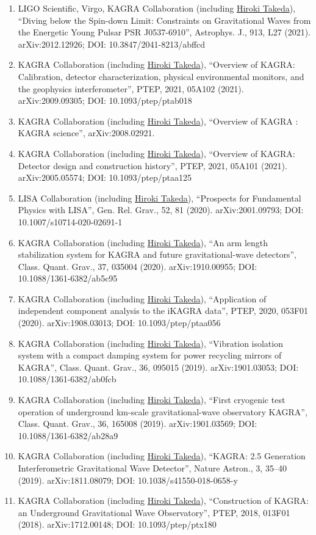 \documentclass[uplatex, 12pt]{article}
\begin{document}
\begin{enumerate}
\item LIGO Scientific, Virgo, KAGRA Collaboration (including \uline{Hiroki Takeda}), “Diving below the Spin-down Limit: Constraints on Gravitational Waves from the
Energetic Young Pulsar PSR J0537-6910”, Astrophys. J., 913, L27 (2021). arXiv:2012.12926; DOI: 10.3847/2041-8213/abffcd
\item KAGRA Collaboration (including \uline{Hiroki Takeda}), “Overview of KAGRA: Calibration, detector characterization, physical environmental monitors, and the geophysics interferometer”, PTEP, 2021, 05A102 (2021). arXiv:2009.09305; DOI: 10.1093/ptep/ptab018
\item KAGRA Collaboration (including \uline{Hiroki Takeda}), “Overview of KAGRA : KAGRA science”, arXiv:2008.02921.
\item KAGRA Collaboration (including \uline{Hiroki Takeda}), “Overview of KAGRA: Detector design and construction history”, PTEP, 2021, 05A101 (2021). arXiv:2005.05574; DOI: 10.1093/ptep/ptaa125
\item LISA Collaboration (including \uline{Hiroki Takeda}), “Prospects for Fundamental Physics with LISA”, Gen. Rel. Grav., 52, 81 (2020). arXiv:2001.09793; DOI: 10.1007/s10714-020-02691-1
\item KAGRA Collaboration (including \uline{Hiroki Takeda}), “An arm length stabilization system for KAGRA and future gravitational-wave detectors”, Class. Quant. Grav., 37, 035004 (2020). arXiv:1910.00955; DOI: 10.1088/1361-6382/ab5c95
\item KAGRA Collaboration (including \uline{Hiroki Takeda}), “Application of independent component analysis to the iKAGRA data”, PTEP, 2020, 053F01 (2020). arXiv:1908.03013; DOI: 10.1093/ptep/ptaa056
\item KAGRA Collaboration (including \uline{Hiroki Takeda}), “Vibration isolation system with a compact damping system for power recycling mirrors of KAGRA”, Class. Quant. Grav., 36, 095015 (2019). arXiv:1901.03053; DOI: 10.1088/1361-6382/ab0fcb
\item KAGRA Collaboration (including \uline{Hiroki Takeda}), “First cryogenic test operation of underground km-scale gravitational-wave observatory KAGRA”, Class. Quant. Grav., 36, 165008 (2019). arXiv:1901.03569; DOI: 10.1088/1361-6382/ab28a9
\item KAGRA Collaboration (including \uline{Hiroki Takeda}), “KAGRA: 2.5 Generation Interferometric Gravitational Wave Detector”, Nature Astron., 3, 35--40 (2019). arXiv:1811.08079; DOI: 10.1038/s41550-018-0658-y
\item KAGRA Collaboration (including \uline{Hiroki Takeda}), “Construction of KAGRA: an Underground Gravitational Wave Observatory”, PTEP, 2018, 013F01 (2018). arXiv:1712.00148; DOI: 10.1093/ptep/ptx180

\end{enumerate}
\end{document}
